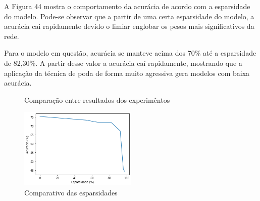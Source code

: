 A Figura 44 mostra o comportamento da acurácia de acordo com a esparsidade do modelo. Pode-se observar que a partir de uma certa esparsidade do modelo, a acurácia cai rapidamente devido o limiar englobar os pesos mais significativos da rede. 

Para o modelo em questão, acurácia se manteve acima dos 70\% até a esparsidade de 82,30\%. A partir desse valor a acurácia caí rapidamente, mostrando que a aplicação da técnica de poda de forma muito agressiva gera modelos com baixa acurácia.

\begin{figure}[H]
  \centering
  \hfill
  \hfill
  \hfill
  
  \caption[Comparação entre os resultados dos experimêntos]{Comparação entre resultados dos experimêntos}
\end{figure}

\begin{figure}[H]
	\includegraphics[width=0.5\textwidth, keepaspectratio=true]{figuras/accxspar_.png}
	\centering
	\caption[Comparativo das esparsidades]{Comparativo das esparsidades}
\end{figure}
